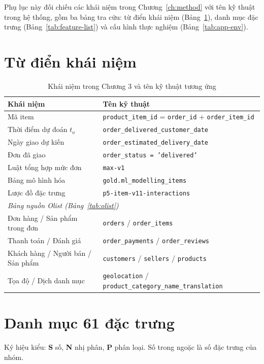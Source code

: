 \documentclass[12pt,a4paper]{report}
\begin{document}
Phụ lục này đối chiếu các khái niệm trong Chương~\ref{ch:method} với tên kỹ thuật trong hệ thống, gồm ba bảng tra cứu: từ điển khái niệm (Bảng~\ref{tab:app-dict}), danh mục đặc trưng (Bảng~\ref{tab:feature-list}) và cấu hình thực nghiệm (Bảng~\ref{tab:app-env}).

\section{Từ điển khái niệm}\label{app:ids}
\begin{table}[htbp]\centering\small
\caption{Khái niệm trong Chương 3 và tên kỹ thuật tương ứng}\label{tab:app-dict}
\begin{tabular}{p{4.6cm}p{9.2cm}}
\toprule
Khái niệm & Tên kỹ thuật \\
\midrule
Mã item         & \texttt{product\_item\_id} = \texttt{order\_id} + \texttt{order\_item\_id} \\
Thời điểm dự đoán $t_o$ & \texttt{order\_delivered\_customer\_date} \\
Ngày giao dự kiến & \texttt{order\_estimated\_delivery\_date} \\
Đơn đã giao     & \texttt{order\_status = 'delivered'} \\
Luật tổng hợp mức đơn & \texttt{max-v1} \\
Bảng mô hình hóa & \texttt{gold.ml\_modelling\_items} \\
Lược đồ đặc trưng & \texttt{p5-item-v11-interactions} \\
\midrule
\multicolumn{2}{l}{\emph{Bảng nguồn Olist (Bảng~\ref{tab:olist})}} \\
Đơn hàng / Sản phẩm trong đơn & \texttt{orders} / \texttt{order\_items} \\
Thanh toán / Đánh giá & \texttt{order\_payments} / \texttt{order\_reviews} \\
Khách hàng / Người bán / Sản phẩm & \texttt{customers} / \texttt{sellers} / \texttt{products} \\
Tọa độ / Dịch danh mục & \texttt{geolocation} / \texttt{product\_category\_name\_translation} \\
\bottomrule
\end{tabular}
\end{table}

\section{Danh mục 61 đặc trưng}\label{app:features}
Ký hiệu kiểu: \textbf{S} số, \textbf{N} nhị phân, \textbf{P} phân loại. Số trong ngoặc là số đặc trưng của nhóm.
\end{document}
